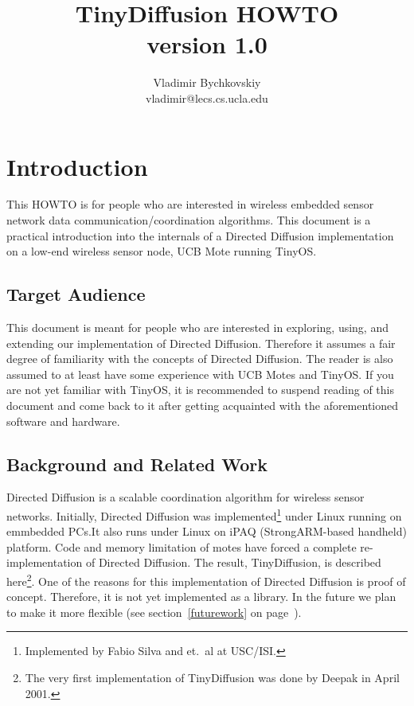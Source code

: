 \documentclass[11pt,onecolumn]{article}
\begin{document}
\title{TinyDiffusion HOWTO\\version 1.0}

\author{Vladimir Bychkovskiy\\vladimir@lecs.cs.ucla.edu}
\date{}

\maketitle

\tableofcontents

\section{Introduction}
This HOWTO is for people who are interested in wireless embedded
sensor network data communication/coordination algorithms. This
document is a practical introduction into the internals of a Directed
Diffusion\cite{diffpaper} implementation on a low-end wireless sensor
node, UCB Mote running TinyOS\cite{tinyos}.

\subsection{Target Audience}
This document is meant for people who are interested in
exploring, using, and extending our implementation of Directed
Diffusion. Therefore it assumes a fair degree of familiarity with the
concepts of Directed Diffusion. The reader is also assumed to at least
have some experience with UCB Motes and TinyOS\cite{tinyos}. If you
are not yet familiar with TinyOS, it is recommended to suspend
reading of this document and come back to it after getting acquainted
with the aforementioned software and hardware\cite{tinyoswebsite}.

\subsection{\label{background}Background and Related Work}
Directed Diffusion\cite{diffpaper} is a scalable coordination
algorithm for wireless sensor networks. Initially, Directed Diffusion
was implemented\footnote{Implemented by Fabio Silva and et.\ al at
USC/ISI.} under Linux running on emmbedded PCs\cite{fabiocode}.It also
runs under Linux on iPAQ (StrongARM-based handheld) platform. Code and
memory limitation of motes have forced a complete re-implementation of
Directed Diffusion. The result, TinyDiffusion, is described
here\footnote{The very first implementation of TinyDiffusion was done
by Deepak in April 2001.}. One of the reasons for this implementation
of Directed Diffusion is proof of concept. Therefore, it is not yet
implemented as a library. In the future we plan to make it more
flexible (see section~\ref{futurework} on page~\pageref{futurework}).
\end{document}
